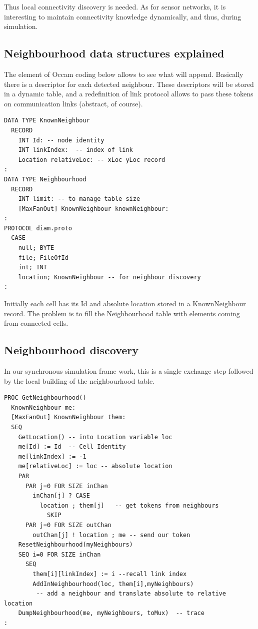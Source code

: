 Thus local connectivity discovery is needed. As for sensor networks, it is interesting
to maintain connectivity knowledge  dynamically, and thus, during simulation.

 \subsection {Neighbourhood data structures explained }

The element of Occam coding below allows to see what will append. Basically there
is a descriptor for each detected neighbour. These descriptors will be stored
in a dynamic table, and a redefinition of link protocol allows to pass these tokens
on communication links (abstract, of course).

\begin{lstlisting}  
DATA TYPE KnownNeighbour
  RECORD
    INT Id: -- node identity
    INT linkIndex:  -- index of link
    Location relativeLoc: -- xLoc yLoc record
:
DATA TYPE Neighbourhood
  RECORD
    INT limit: -- to manage table size
    [MaxFanOut] KnownNeighbour knownNeighbour:
:
PROTOCOL diam.proto
  CASE
    null; BYTE
    file; FileOfId
    int; INT
    location; KnownNeighbour -- for neighbour discovery
:
\end{lstlisting}



Initially each cell has its Id and absolute location stored in a KnownNeighbour
record. The problem is to fill the Neighbourhood table with elements coming
from connected cells.



 \subsection {Neighbourhood   discovery }

In our synchronous simulation frame work, this is a single exchange step
followed by the local building of the neighbourhood table.


\begin{lstlisting}
PROC GetNeighbourhood()
  KnownNeighbour me:
  [MaxFanOut] KnownNeighbour them: 
  SEQ
    GetLocation() -- into Location variable loc
    me[Id] := Id  -- Cell Identity
    me[linkIndex] := -1 
    me[relativeLoc] := loc -- absolute location
    PAR
      PAR j=0 FOR SIZE inChan
        inChan[j] ? CASE
          location ; them[j]   -- get tokens from neighbours
            SKIP 
      PAR j=0 FOR SIZE outChan
        outChan[j] ! location ; me -- send our token
    ResetNeighbourhood(myNeighbours)
    SEQ i=0 FOR SIZE inChan
      SEQ
        them[i][linkIndex] := i --recall link index
        AddInNeighbourhood(loc, them[i],myNeighbours)
         -- add a neighbour and translate absolute to relative location
    DumpNeighbourhood(me, myNeighbours, toMux)  -- trace
:
\end{lstlisting}

